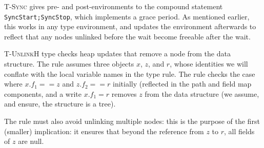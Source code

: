\textsc{T-Sync} gives pre- and post-environments to the compound statement \lstinline|SyncStart;SyncStop|, which implements a grace period.  As mentioned earlier, this works in any type environment, and updates the environment afterwards to reflect that any nodes \textsf{unlinked} before the wait become \textsf{freeable} after the wait.

\textsc{T-UnlinkH} type checks heap updates that remove a node from the data structure.  The rule assumes three objects $x$, $z$, and $r$, whose identities we will conflate with the local variable names in the type rule.  The rule checks the case where $x.f_1==z$ and $z.f_2==r$ initially (reflected in the path and field map components, and a write $x.f_1=r$ removes $z$ from the data structure (we assume, and ensure, the structure is a tree).

The rule must also avoid unlinking multiple nodes: this is the purpose of the first (smaller) implication: it ensures that beyond the reference from $z$ to $r$, all fields of $z$ are null.


